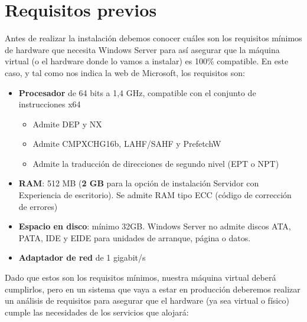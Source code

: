 \section{Requisitos previos}
Antes de realizar la instalación debemos conocer cuáles son los requisitos mínimos de hardware que necesita Windows Server para así asegurar que la máquina virtual (o el hardware donde lo vamos a instalar) es 100\% compatible. En este caso, y tal como nos indica la web de Microsoft, los requisitos son:

\begin{itemize}
    \item \textbf{Procesador} de 64 bits a 1,4 GHz, compatible con el conjunto de instrucciones x64
    \begin{itemize}
        \item Admite DEP y NX
        \item Admite CMPXCHG16b, LAHF/SAHF y PrefetchW
        \item Admite la traducción de direcciones de segundo nivel (EPT o NPT)
    \end{itemize}
    \item \textbf{RAM}: 512 MB (\textbf{2 GB} para la opción de instalación Servidor con Experiencia de escritorio). Se admite RAM tipo ECC (código de corrección de errores)
    \item \textbf{Espacio en disco}:  mínimo 32GB. Windows Server no admite discos ATA, PATA, IDE y EIDE para unidades de arranque, página o datos.
    \item \textbf{Adaptador de red} de 1 gigabit/s
\end{itemize}

Dado que estos son los requisitos mínimos, nuestra máquina virtual deberá cumplirlos, pero en un sistema que vaya a estar en producción deberemos realizar un análisis de requisitos para asegurar que el hardware (ya sea virtual o físico) cumple las necesidades de los servicios que alojará:

